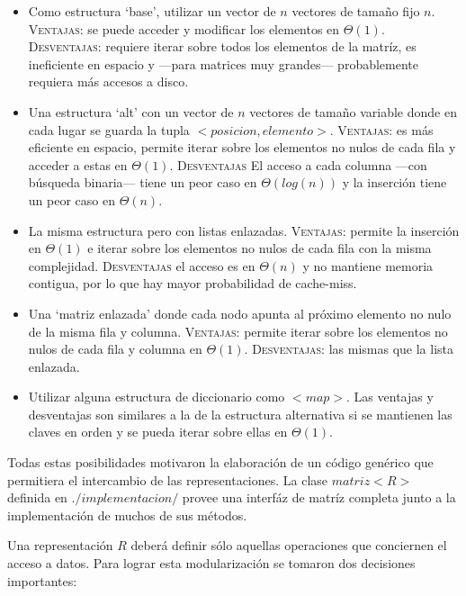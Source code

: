 \vspace{1em}
\begin{itemize}
    \item Como estructura `base', utilizar un vector de $n$ vectores de tamaño fijo $n$. \textsc{Ventajas}: se puede acceder y modificar los elementos en $\Theta(1)$. \textsc{Desventajas}: requiere iterar sobre todos los elementos de la matríz, es ineficiente en espacio y ---para matrices muy grandes--- probablemente requiera más accesos a disco.\\
    \item Una estructura `alt' con un vector de $n$ vectores de tamaño variable donde en cada lugar se guarda la tupla $<posicion, elemento>$. \textsc{Ventajas}: es más eficiente en espacio, permite iterar sobre los elementos no nulos de cada fila y acceder a estas en $\Theta(1)$. \textsc{Desventajas} El acceso a cada columna ---con búsqueda binaria--- tiene un peor caso en $\Theta(log(n))$ y la inserción tiene un peor caso en $\Theta(n)$.\\
    \item La misma estructura pero con listas enlazadas. \textsc{Ventajas}: permite la inserción en $\Theta(1)$ e iterar sobre los elementos no nulos de cada fila con la misma complejidad. \textsc{Desventajas} el acceso es en $\Theta(n)$ y no mantiene memoria contigua, por lo que hay mayor probabilidad de cache-miss.\\
    \item Una `matriz enlazada' donde cada nodo apunta al próximo elemento no nulo de la misma fila y columna. \textsc{Ventajas}: permite iterar sobre los elementos no nulos de cada fila y columna en $\Theta(1)$. \textsc{Desventajas}: las mismas que la lista enlazada.\\
    \item Utilizar alguna estructura de diccionario como $<map>$. Las ventajas y desventajas son similares a la de la estructura alternativa si se mantienen las claves en orden y se pueda iterar sobre ellas en $\Theta(1)$.   
\end{itemize}

\vspace{1em}
Todas estas posibilidades motivaron la elaboración de un código genérico que permitiera el intercambio de las representaciones. La clase $matriz<R>$ definida en $./implementacion/$ provee una interfáz de matríz completa junto a la implementación de muchos de sus métodos. 

Una representación $R$ deberá definir sólo aquellas operaciones que conciernen el acceso a datos. Para lograr esta modularización se tomaron dos decisiones importantes:

